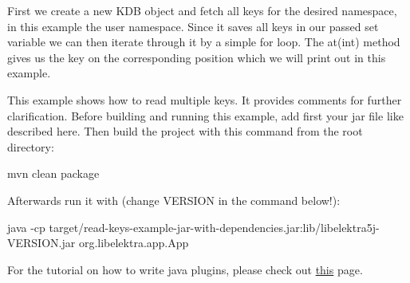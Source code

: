First we create a new {\ttfamily K\+DB} object and fetch all keys for the desired namespace, in this example the {\ttfamily user} namespace. Since it saves all keys in our passed {\ttfamily set} variable we can then iterate through it by a simple for loop. The {\ttfamily at(int)} method gives us the key on the corresponding position which we will print out in this example.

This example shows how to read multiple keys. It provides comments for further clarification. Before building and running this example, add first your jar file like described here. Then build the project with this command from the root directory\+:


\begin{DoxyCode}
mvn clean package
\end{DoxyCode}


Afterwards run it with (change V\+E\+R\+S\+I\+ON in the command below!)\+:


\begin{DoxyCode}
java -cp target/read-keys-example-jar-with-dependencies.jar:lib/libelektra5j-VERSION.jar
       org.libelektra.app.App
\end{DoxyCode}


For the tutorial on how to write java plugins, please check out \hyperlink{doc_tutorials_java-plugins_md}{this} page. 